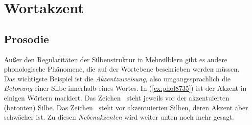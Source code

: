\section{Wortakzent}

\label{sec:wortakzent}

\subsection{Prosodie}

\label{sec:prosodie}


Außer den Regularitäten der Silbenstruktur in Mehrsilblern gibt es andere phonologische Phänomene, die auf der Wortebene beschrieben werden müssen.
Das wichtigste Beispiel ist die \textit{Akzentzuweisung}, also umgangssprachlich die \textit{Betonung} einer Silbe innerhalb eines Wortes.
In (\ref{ex:phol8735}) ist der Akzent in einigen Wörtern markiert.
Das Zeichen \Akz\ steht jeweils vor der akzentuierten (betonten) Silbe.
Das Zeichen \Nakz\ steht vor akzentuierten Silben, deren Akzent aber schwächer ist.
Zu diesen \textit{Nebenakzenten} wird weiter unten noch mehr gesagt.

\begin{exe}
  \ex\label{ex:phol8735}
  \begin{xlist}
  \end{xlist}
\end{exe}

